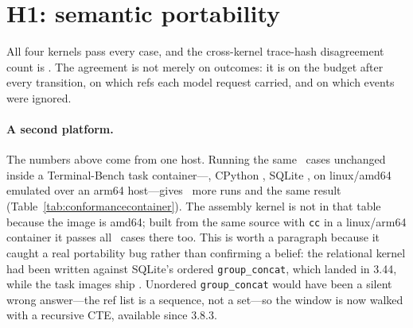 \documentclass[11pt,a4paper]{article}
\begin{document}
\section{H1: semantic portability}
\label{sec:h1}

\begin{table}[h]\centering\small
\caption{Conformance. \confcases\ recorded cases, \confruns\ kernel runs,
\confwall s wall. Cases are generated from a table-driven derivation of the
transition rules, written separately from any kernel and by the same author; a
kernel passes a case only if its effect stream and its canonical trace match
that oracle record for record. Agreement with it is therefore evidence that
four substrates implement one specification, not that the specification is
right.}
\label{tab:conformance}

\end{table}

All four kernels pass every case, and the cross-kernel trace-hash disagreement
count is \confdisagree. The agreement is not merely on outcomes: it is on the
budget after every transition, on which refs each model request carried, and on
which events were ignored.

\paragraph{A second platform.}
The numbers above come from one host. Running the same \confcases\ cases
unchanged inside a Terminal-Bench task container---\containerplatform, CPython
\containerpython, SQLite \containersqlite, on linux/amd64 emulated over an
arm64 host---gives \containerruns\ more runs and the same result
(Table~\ref{tab:conformancecontainer}). The assembly kernel is not in that
table because the image is amd64; built from the same source with \texttt{cc}
in a linux/arm64 container it passes all \confcases\ cases there too. This is worth a paragraph because it
caught a real portability bug rather than confirming a belief: the relational
kernel had been written against SQLite's ordered \texttt{group\_concat}, which
landed in 3.44, while the task images ship \containersqlite. Unordered
\texttt{group\_concat} would have been a silent wrong answer---the ref list is
a sequence, not a set---so the window is now walked with a recursive CTE,
available since 3.8.3.

\begin{table}[h]\centering\small
\caption{The same cases inside a Terminal-Bench task container.}
\label{tab:conformancecontainer}

\end{table}
\end{document}
